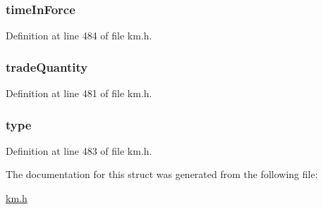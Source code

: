 \subsubsection[{\texorpdfstring{time\+In\+Force}{timeInForce}}]{ time\+In\+Force}\hypertarget{struct_k_1_1m_order_a322c334ae7e885ce9824010ad89c45cc}{}\label{struct_k_1_1m_order_a322c334ae7e885ce9824010ad89c45cc}


Definition at line 484 of file km.\+h.

\subsubsection[{\texorpdfstring{trade\+Quantity}{tradeQuantity}}]{ trade\+Quantity}\hypertarget{struct_k_1_1m_order_aff1b87a24fb56767cd817854097cf285}{}\label{struct_k_1_1m_order_aff1b87a24fb56767cd817854097cf285}


Definition at line 481 of file km.\+h.

\subsubsection[{\texorpdfstring{type}{type}}]{ type}\hypertarget{struct_k_1_1m_order_aa62fbff32723469c5aceebe303d5bd3e}{}\label{struct_k_1_1m_order_aa62fbff32723469c5aceebe303d5bd3e}


Definition at line 483 of file km.\+h.



The documentation for this struct was generated from the following file\+:\begin{DoxyCompactItemize}
\item 
\hyperlink{km_8h}{km.\+h}\end{DoxyCompactItemize}
